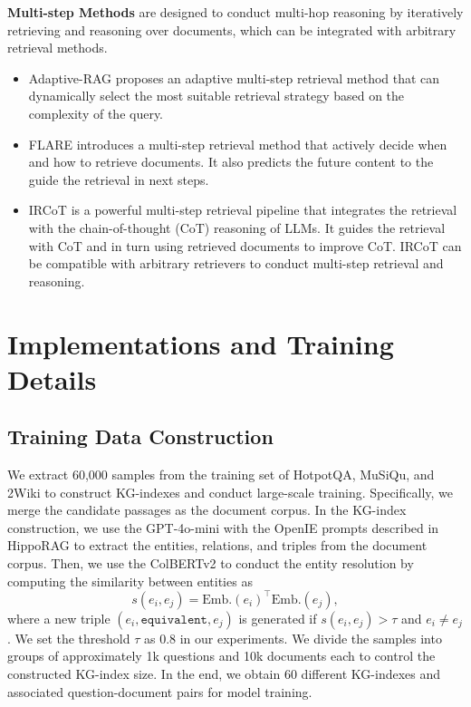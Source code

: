 \noindent\textbf{Multi-step Methods} are designed to conduct multi-hop reasoning by iteratively retrieving and reasoning over documents, which can be integrated with arbitrary retrieval methods.
\begin{itemize}
    \item Adaptive-RAG \citep{jeong2024adaptive} proposes an adaptive multi-step retrieval method that can dynamically select the most suitable retrieval strategy based on the complexity of the query.
    \item FLARE \citep{jiang2023active} introduces a multi-step retrieval method that actively decide when and how to retrieve documents. It also predicts the future content to the guide the retrieval in next steps. 
    \item IRCoT \citep{trivedi2023interleaving} is a powerful multi-step retrieval pipeline that integrates the retrieval with the chain-of-thought (CoT) reasoning of LLMs. It guides the retrieval with CoT and in turn using retrieved documents to improve CoT. IRCoT can be compatible with arbitrary retrievers to conduct multi-step retrieval and reasoning.
\end{itemize}

\section{Implementations and Training Details}\label{app:implementation}

\subsection{Training Data Construction}\label{app:kg_index}
We extract 60,000 samples from the training set of HotpotQA, MuSiQu, and 2Wiki to construct KG-indexes and conduct large-scale training. Specifically, we merge the candidate passages as the document corpus. In the KG-index construction, we use the GPT-4o-mini \citep{gpt4o} with the OpenIE prompts described in HippoRAG \citep{gutiérrez2024hipporag} to extract the entities, relations, and triples from the document corpus. Then, we use the ColBERTv2 \citep{santhanam2022colbertv2} to conduct the entity resolution by computing the similarity between entities as
\begin{equation}
    s(e_i, e_j) = \text{Emb.}(e_i)^{\top} \text{Emb.}(e_j), 
\end{equation}
where a new triple $(e_i, \texttt{equivalent}, e_j)$ is generated if $s(e_i, e_j) > \tau$ and $e_i \neq e_j$. We set the threshold $\tau$ as 0.8 in our experiments. We divide the samples into groups of approximately 1k questions and 10k documents each to control the constructed KG-index size. In the end, we obtain 60 different KG-indexes and associated question-document pairs for model training.

